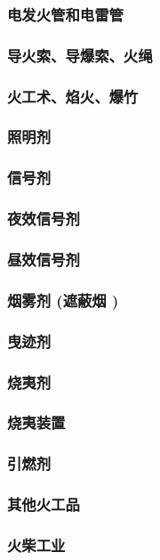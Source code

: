 \documentclass[UTF8]{../../ApplicationUniverse}
\begin{document}
    \subsubsection{电发火管和电雷管}
    \subsubsection{导火索、导爆索、火绳}
\subsubsection{火工术、焰火、爆竹}
    \subsubsection{照明剂}
    \subsubsection{信号剂}
        \subsubsection{夜效信号剂}
        \subsubsection{昼效信号剂}
    \subsubsection{烟雾剂 (遮蔽烟 )}
    \subsubsection{曳迹剂}
    \subsubsection{烧夷剂}
        \subsubsection{烧夷装置}
    \subsubsection{引燃剂}
    \subsubsection{其他火工品}
\subsubsection{火柴工业}
\end{document}
